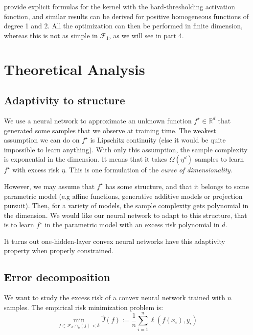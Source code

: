 \documentclass[a4paper, 11pt]{scrartcl}
\begin{document}
{\cite{le2007continuous} provide explicit formulas for the kernel with the hard-thresholding activation fonction, and similar results can be derived for positive homogeneous functions of degree 1 and 2. All the optimization can then be performed in finite dimension, whereas this is not as simple in $\mathcal{F}_1$, as we will see in part 4.

\section{Theoretical Analysis}

\subsection{Adaptivity to structure}

We use a neural network to approximate an unknown function $f^\star \in \mathbb{R}^d$ that generated some samples that we observe at training time. The weakest assumption we can do on $f^\star$ is Lipschitz continuity (else it would be quite impossible to learn anything). With only this assumption, the sample complexity is exponential in the dimension. It means that it takes $\Omega(\eta^{d})$ samples to learn $f^\star$ with excess risk $\eta$. This is one formulation of the \textit{curse of dimensionality}.

However, we may assume that $f^\star$ has some structure, and that it belongs to some parametric model (e.g affine functions, generative additive models or projection pursuit). Then, for a variety of models, the sample complexity gets polynomial in the dimension. We would like our neural network to adapt to this structure, that is to learn $f^\star$ in the parametric model with an excess risk polynomial in $d$.

It turns out one-hidden-layer convex neural networks have this adaptivity property when properly constrained. 

\subsection{Error decomposition}

We want to study the excess risk of a convex neural network trained with $n$ samples. The empirical risk minimization problem is:
\begin{equation}
\min_{f \in \mathcal{F}_k, \gamma_k(f)<\delta} \hat J(f) := \frac{1}{n} \sum_{i=1}^n \ell(f(x_i), y_i)
\end{equation}

}
\end{document}
